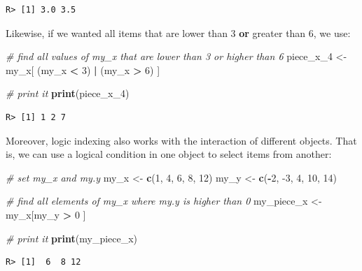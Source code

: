 \documentclass[
  12pt,
]{book}
\newenvironment{Shaded}{\begin{snugshade}}{\end{snugshade}}
\newcommand{\CommentTok}[1]{\textcolor[rgb]{0.37,0.37,0.37}{\textit{#1}}}
\newcommand{\DecValTok}[1]{\textcolor[rgb]{0.06,0.06,0.06}{#1}}
\newcommand{\KeywordTok}[1]{\textcolor[rgb]{0.27,0.27,0.27}{\textbf{#1}}}
\newcommand{\NormalTok}[1]{#1}
\newcommand{\OperatorTok}[1]{\textcolor[rgb]{0.43,0.43,0.43}{\textbf{#1}}}
\newcommand{\StringTok}[1]{\textcolor[rgb]{0.5,0.5,0.5}{#1}}
\begin{document}
\begin{verbatim}
R> [1] 3.0 3.5
\end{verbatim}

Likewise, if we wanted all items that are lower than 3 \textbf{or} greater than 6, we use:

\begin{Shaded}
\begin{Highlighting}[]
\CommentTok{# find all values of my_x that are lower than 3 or higher than 6}
\NormalTok{piece_x_}\DecValTok{4}\NormalTok{ <-}\StringTok{ }\NormalTok{my_x[ (my_x }\OperatorTok{<}\StringTok{ }\DecValTok{3}\NormalTok{) }\OperatorTok{|}\StringTok{ }\NormalTok{(my_x }\OperatorTok{>}\StringTok{ }\DecValTok{6}\NormalTok{) ]}

\CommentTok{# print it}
\KeywordTok{print}\NormalTok{(piece_x_}\DecValTok{4}\NormalTok{)}
\end{Highlighting}
\end{Shaded}

\begin{verbatim}
R> [1] 1 2 7
\end{verbatim}

Moreover, logic indexing also works with the interaction of different objects. That is, we can use a logical condition in one object to select items from another:

\begin{Shaded}
\begin{Highlighting}[]
\CommentTok{# set my_x and my.y}
\NormalTok{my_x <-}\StringTok{ }\KeywordTok{c}\NormalTok{(}\DecValTok{1}\NormalTok{, }\DecValTok{4}\NormalTok{, }\DecValTok{6}\NormalTok{, }\DecValTok{8}\NormalTok{, }\DecValTok{12}\NormalTok{)}
\NormalTok{my_y <-}\StringTok{ }\KeywordTok{c}\NormalTok{(}\OperatorTok{-}\DecValTok{2}\NormalTok{, }\DecValTok{-3}\NormalTok{, }\DecValTok{4}\NormalTok{, }\DecValTok{10}\NormalTok{, }\DecValTok{14}\NormalTok{)}

\CommentTok{# find all elements of my_x where my.y is higher than 0}
\NormalTok{my_piece_x <-}\StringTok{ }\NormalTok{my_x[my_y }\OperatorTok{>}\StringTok{ }\DecValTok{0}\NormalTok{ ]}

\CommentTok{# print it}
\KeywordTok{print}\NormalTok{(my_piece_x)}
\end{Highlighting}
\end{Shaded}

\begin{verbatim}
R> [1]  6  8 12
\end{verbatim}
\end{document}

